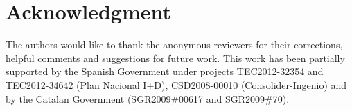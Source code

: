 \documentclass[conference]{IEEEtran}
\newcommand{\Az}[1]{{\color{black}{#1}}}
\begin{document}


%




\section*{Acknowledgment}

The authors would like to thank the anonymous reviewers for their corrections, helpful comments and suggestions for future work.
This work has been partially supported by the Spanish Government under projects TEC2012-32354 and TEC2012-34642 (Plan Nacional I+D), CSD2008-00010 (Consolider-Ingenio) and by the Catalan Government (SGR2009\#00617 and SGR2009\#70).





\end{document}

